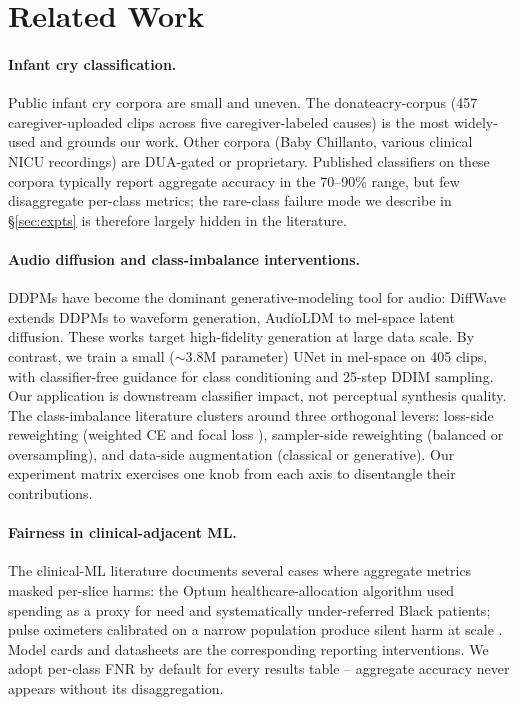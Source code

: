 \documentclass[pmlr,twocolumn,10pt]{jmlr}
\begin{document}
\section{Related Work}\label{sec:past}
\paragraph{Infant cry classification.} Public infant cry corpora are small and uneven. The donateacry-corpus \citep{donateacry} (457 caregiver-uploaded clips across five caregiver-labeled causes) is the most widely-used and grounds our work. Other corpora (Baby Chillanto, various clinical NICU recordings) are DUA-gated or proprietary. Published classifiers on these corpora typically report aggregate accuracy in the 70--90\% range, but few disaggregate per-class metrics; the rare-class failure mode we describe in \S\ref{sec:expts} is therefore largely hidden in the literature.

\paragraph{Audio diffusion and class-imbalance interventions.} DDPMs \citep{ho2020denoising} have become the dominant generative-modeling tool for audio: DiffWave \citep{kong2021diffwave} extends DDPMs to waveform generation, AudioLDM \citep{liu2023audioldm} to mel-space latent diffusion. These works target high-fidelity generation at large data scale. By contrast, we train a small ($\sim$3.8M parameter) UNet in mel-space on 405 clips, with classifier-free guidance \citep{ho2021classifier} for class conditioning and 25-step DDIM \citep{song2021ddim} sampling. Our application is downstream classifier impact, not perceptual synthesis quality. The class-imbalance literature \citep{johnson2019survey} clusters around three orthogonal levers: loss-side reweighting (weighted CE and focal loss \citep{lin2017focal}), sampler-side reweighting (balanced or oversampling), and data-side augmentation (classical \citep{park2019specaugment} or generative). Our experiment matrix exercises one knob from each axis to disentangle their contributions.

\paragraph{Fairness in clinical-adjacent ML.} The clinical-ML literature documents several cases where aggregate metrics masked per-slice harms: the Optum healthcare-allocation algorithm \citep{obermeyer2019dissecting} used spending as a proxy for need and systematically under-referred Black patients; pulse oximeters calibrated on a narrow population produce silent harm at scale \citep{sjoding2020racial}. Model cards \citep{mitchell2019model} and datasheets \citep{gebru2021datasheets} are the corresponding reporting interventions. We adopt per-class FNR by default for every results table -- aggregate accuracy never appears without its disaggregation.
\end{document}
